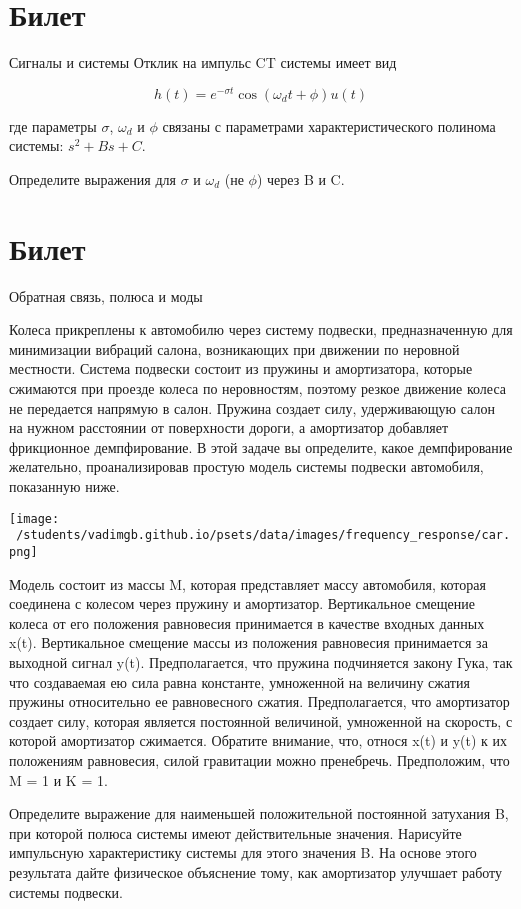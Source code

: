 \documentclass{exam}
\begin{document}
\section{Билет}
\begin{questions}
	\question 
	Сигналы и системы 
	\question 
Отклик на импульс CT системы имеет вид

\[
h(t)=e^{-\sigma t} \cos(\omega_dt+\phi)u(t)
\]

где параметры \(\sigma\), \(\omega_d\) и \(\phi\) связаны с параметрами 
характеристического полинома системы: \(s^2 + Bs + C\).

Определите выражения для \(\sigma\) и \(\omega_d\)  
(не \(\phi\))  через B и C.

\end{questions}
\vspace{15pt}


\section{Билет}
\begin{questions}
	\question 
Обратная связь, полюса и моды 

	\question 
Колеса прикреплены к автомобилю через систему подвески, 
предназначенную для минимизации вибраций салона, возникающих 
при движении по неровной местности.
Система подвески состоит из пружины и амортизатора, которые 
сжимаются при проезде колеса по неровностям, поэтому резкое 
движение колеса не передается напрямую в салон.
Пружина создает силу, удерживающую салон на нужном расстоянии 
от поверхности дороги, а амортизатор добавляет фрикционное демпфирование.
В этой задаче вы определите, какое демпфирование желательно, 
проанализировав простую модель системы подвески автомобиля, показанную ниже.


	\texttt{[image: ~/students/vadimgb.github.io/psets/data/images/frequency\_response/car.png]}

Модель состоит из массы M, которая представляет массу автомобиля, 
которая соединена с колесом через пружину и амортизатор.
Вертикальное смещение колеса от его положения равновесия принимается 
в качестве входных данных x(t).
Вертикальное смещение массы из положения равновесия принимается за выходной сигнал y(t).
Предполагается, что пружина подчиняется закону Гука, так что создаваемая 
ею сила равна константе, умноженной на величину сжатия пружины относительно 
ее равновесного сжатия.
Предполагается, что амортизатор создает силу, которая является постоянной 
величиной, умноженной на скорость, с которой амортизатор сжимается.
Обратите внимание, что, относя x(t) и y(t) к их положениям равновесия, 
силой гравитации можно пренебречь.
Предположим, что M = 1 и K = 1.
	
Определите выражение для наименьшей положительной 
		постоянной затухания B, при которой полюса системы имеют 
		действительные значения.  
		Нарисуйте импульсную характеристику системы для этого значения B.  
		На основе этого результата дайте физическое объяснение тому, 
		как амортизатор улучшает работу системы подвески.
\end{questions}
\vspace{15pt}
\end{document}
